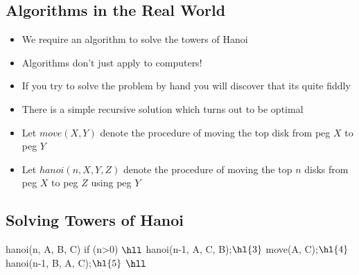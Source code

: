 \begin{slide}
\section[-1]{Algorithms in the Real World}

\begin{PauseHighLight}
  \begin{itemize}
  \item We require an algorithm to solve the towers of Hanoi\pause
  \item Algorithms don't just apply to computers!\pause
  \item If you try to solve the problem by hand you will discover that
    its quite fiddly\pause
  \item There is a simple recursive solution which turns out to be
    optimal\pause
  \item Let \jl$move(X,Y)$ denote the procedure of moving the top disk from
  peg \jl$X$ to peg \jl$Y$\pause
  \item Let \jl$hanoi(n,X,Y,Z)$ denote the procedure of moving the top
    \jl$n$ disks from peg \jl$X$ to peg \jl$Z$ using peg \jl$Y$\pause
  \end{itemize}
\end{PauseHighLight}

\end{slide}


\begin{slide}
\section[-1]{Solving Towers of Hanoi}
\pausebuild
\begin{java}
  hanoi(n, A, B, C)
  {
    if (n>0) {$\hll$
       hanoi(n-1, A, C, B);$\hl{3}$
       move(A, C);$\hl{4}$
       hanoi(n-1, B, A, C);$\hl{5}$
    }
  }$\hll$
\end{java}
\begin{center}
  \pause
\end{center}
\end{slide}


